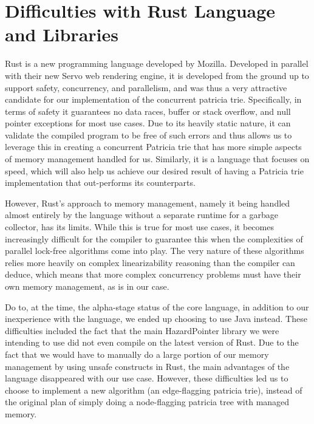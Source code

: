 \documentclass[conference]{IEEEtran}
\begin{document}
\section{Difficulties with Rust Language and Libraries}
Rust is a new programming language developed by Mozilla. Developed in parallel with their new Servo web rendering engine, it is developed from the ground up to support safety, concurrency, and parallelism, and was thus a very attractive candidate for our implementation of the concurrent patricia trie.\cite{MozillaResearch} Specifically, in terms of safety it guarantees no data races, buffer or stack overflow, and null pointer exceptions for most use cases. Due to its heavily static nature, it can validate the compiled program to be free of such errors and thus allows us to leverage this in creating a concurrent Patricia trie that has more simple aspects of memory management handled for us. Similarly, it is a language that focuses on speed, which will also help us achieve our desired result of having a Patricia trie implementation that out-performs its counterparts.
\par
However, Rust's approach to memory management, namely it being handled almost entirely by the language without a separate runtime for a garbage collector, has its limits. While this is true for most use cases, it becomes increasingly difficult for the compiler to guarantee this when the complexities of parallel lock-free algorithms come into play. The very nature of these algorithms relies more heavily on complex linearizability reasoning than the compiler can deduce, which means that more complex concurrency problems must have their own memory management, as is in our case.
\par
Do to, at the time, the alpha-stage status of the core language, in addition to our inexperience with the language, we ended up choosing to use Java instead. These difficulties included the fact that the main HazardPointer library we were intending to use did not even compile on the latest version of Rust\cite{CHAMT}. Due to the fact that we would have to manually do a large portion of our memory management by using unsafe constructs in Rust, the main advantages of the language disappeared with our use case. However, these difficulties led us to choose to implement a new algorithm (an edge-flagging patricia trie), instead of the original plan of simply doing a node-flagging patricia tree with managed memory.
\par
\end{document}
